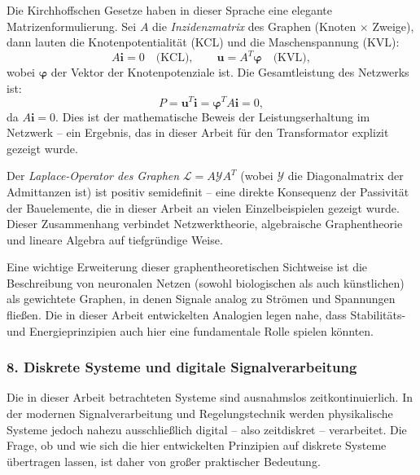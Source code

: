﻿\documentclass[12pt, a4paper]{article}
\begin{document}
	Die Kirchhoffschen Gesetze haben in dieser Sprache eine elegante Matrizenformulierung. Sei $A$ die \textit{Inzidenzmatrix} des Graphen (Knoten $\times$ Zweige), dann lauten die Knotenpotentialität (KCL) und die Maschenspannung (KVL):
	\begin{equation}
		A \mathbf{i} = 0 \quad \text{(KCL)}, \qquad \mathbf{u} = A^T \boldsymbol{\varphi} \quad \text{(KVL)},
	\end{equation}
	wobei $\boldsymbol{\varphi}$ der Vektor der Knotenpotenziale ist. Die Gesamtleistung des Netzwerks ist:
	\begin{equation}
		P = \mathbf{u}^T \mathbf{i} = \boldsymbol{\varphi}^T A \mathbf{i} = 0,
	\end{equation}
	da $A \mathbf{i} = 0$. Dies ist der mathematische Beweis der Leistungserhaltung im Netzwerk -- ein Ergebnis, das in dieser Arbeit für den Transformator explizit gezeigt wurde.

	Der \textit{Laplace-Operator des Graphen} $\mathcal{L} = A \mathcal{Y} A^T$ (wobei $\mathcal{Y}$ die Diagonalmatrix der Admittanzen ist) ist positiv semidefinit -- eine direkte Konsequenz der Passivität der Bauelemente, die in dieser Arbeit an vielen Einzelbeispielen gezeigt wurde. Dieser Zusammenhang verbindet Netzwerktheorie, algebraische Graphentheorie und lineare Algebra auf tiefgründige Weise.

	Eine wichtige Erweiterung dieser graphentheoretischen Sichtweise ist die Beschreibung von neuronalen Netzen (sowohl biologischen als auch künstlichen) als gewichtete Graphen, in denen Signale analog zu Strömen und Spannungen fließen. Die in dieser Arbeit entwickelten Analogien legen nahe, dass Stabilitäts- und Energieprinzipien auch hier eine fundamentale Rolle spielen könnten.

	\subsubsection*{8. \quad Diskrete Systeme und digitale Signalverarbeitung}

	Die in dieser Arbeit betrachteten Systeme sind ausnahmslos zeitkontinuierlich. In der modernen Signalverarbeitung und Regelungstechnik werden physikalische Systeme jedoch nahezu ausschließlich digital -- also zeitdiskret -- verarbeitet. Die Frage, ob und wie sich die hier entwickelten Prinzipien auf diskrete Systeme übertragen lassen, ist daher von großer praktischer Bedeutung.
\end{document}
